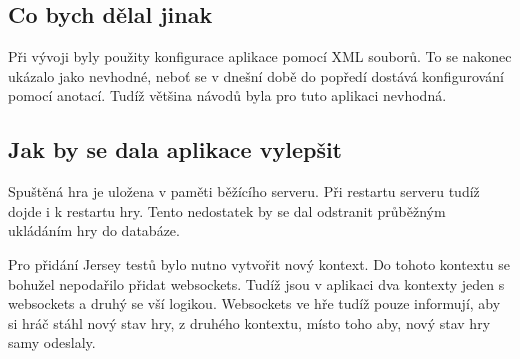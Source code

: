 \documentclass[czech,master,public,dept460,male,cpdeclaration,twoside]{diploma}
\begin{document}
\subsection{Co bych dělal jinak}
Při vývoji byly použity konfigurace aplikace pomocí XML souborů. To se nakonec ukázalo jako nevhodné, neboť se v dnešní době do popředí dostává konfigurování pomocí anotací. Tudíž většina návodů byla pro tuto aplikaci nevhodná.

\subsection{Jak by se dala aplikace vylepšit}
Spuštěná hra je uložena v paměti běžícího serveru. Při restartu serveru tudíž dojde i k restartu hry. Tento nedostatek by se dal odstranit průběžným ukládáním hry do databáze.

Pro přidání Jersey testů bylo nutno vytvořit nový kontext. Do tohoto kontextu se bohužel nepodařilo přidat websockets. Tudíž jsou v aplikaci dva kontexty jeden s websockets a druhý se vší logikou. Websockets ve hře tudíž pouze informují, aby si hráč stáhl nový stav hry, z druhého kontextu, místo toho aby, nový stav hry samy odeslaly. 

\newcommand{\registerToBib}[4]
{
\bibitem{#1}
	{\bf #2}
	{[cit. #3].}
	{\em Dostupne z: #4}
}
\end{document}

